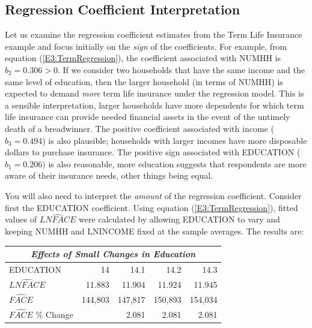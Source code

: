 \subsection{Regression Coefficient
Interpretation}

Let us examine the regression coefficient estimates from the Term
Life Insurance example and focus initially on the \emph{sign} of the
coefficients. For example, from equation (\ref{E3:TermRegression}),
the coefficient associated with NUMHH is $b_2 = 0.306>0$. If we
consider two households that have the same income and the same level
of education, then the larger household (in terms of NUMHH) is
expected to demand \textit{more} term life insurance under the
regression model. This is a sensible interpretation, larger
households have more dependents for which term life insurance can
provide needed financial assets in the event of the untimely death
of a breadwinner. The positive coefficient associated with income
($b_3 = 0.494$) is also plausible; households with larger incomes
have more disposable dollars to purchase insurance. The positive
sign associated with EDUCATION ($b_1 = 0.206)$ is also reasonable,
more education suggests that respondents are more aware of their
insurance needs, other things being equal.

You will also need to interpret the \emph{amount} of the regression
coefficient. Consider first the EDUCATION coefficient. Using
equation (\ref{E3:TermRegression}), fitted values of
$\widehat{LNFACE}$ were calculated by allowing EDUCATION to vary and
keeping NUMHH and LNINCOME fixed at the sample averages. The results
are:
\begin{center}
\begin{tabular}{lrrrr}
\hline \multicolumn{5}{c}{\textit{Effects of Small Changes in Education}} \\
\hline
 EDUCATION                &         14 &       14.1 &       14.2 &       14.3 \\
 $\widehat{LNFACE}$       &     11.883 &     11.904 &     11.924 &     11.945 \\
   $\widehat{FACE}$       &    144,803 &    147,817 &    150,893 &    154,034 \\
$\widehat{FACE}$ \% Change&            &      2.081 &      2.081 &      2.081 \\
\hline
\end{tabular}
\end{center}

